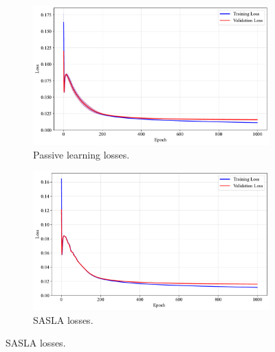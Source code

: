 \documentclass[10pt, conference]{IEEEtran}
\begin{document}
\begin{figure}[!t]
	\centering
	\caption{Losses for training of frameworks with the fashion-MNIST dataset.}
	\label{fig:fashion-loss}
	\begin{subfigure}{\linewidth}
		\centering
		\includegraphics[width=\linewidth]{../results/fashion/losses.pdf}
		\caption{Passive learning losses.}
		\label{fig:losses_fashion}
	\end{subfigure}
	
	\vspace{0.1em}
	
	\begin{subfigure}{\linewidth}
		\centering
		\includegraphics[width=\linewidth]{../results/fashion/os_losses.pdf}
		\caption{SASLA losses.}
		\label{fig:os_losses_fashion}
	\end{subfigure}
	
	\vspace{0.1em}
	

\end{figure}
\end{document}
